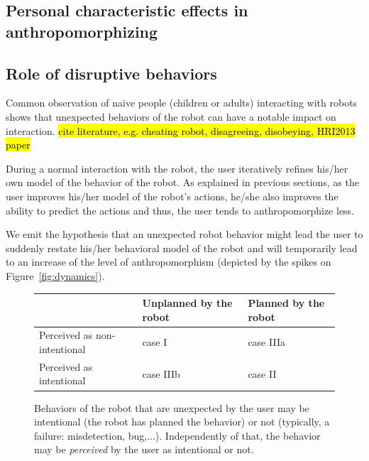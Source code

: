 \documentclass[lettersize, apacite, twoside, HRI]{apa_HRI}
\begin{document}
\subsection{Personal characteristic effects in anthropomorphizing}
\label{sec:8.3}

\subsection{Role of disruptive behaviors}
\label{sec:disruptive}

Common observation of naive people (children or adults) interacting with robots
shows that unexpected behaviors of the robot can have a notable impact on
interaction. \hl{cite literature, e.g. cheating robot, disagreeing, disobeying, HRI2013 paper}

During a normal interaction with the robot, the user iteratively refines his/her own
model of the behavior of the robot. As explained in previous sections, as the
user improves his/her model of the robot's actions, he/she also improves the ability to predict
the actions and thus, the user tends to anthropomorphize less.

We emit the hypothesis that an unexpected robot behavior might lead the user to
suddenly restate his/her behavioral model of the robot and will temporarily lead to
an increase of the level of anthropomorphism (depicted by the spikes on
Figure~\ref{fig:dynamics}).

\begin{figure}
\begin{center}
    \begin{tabular}{ | >{\centering\arraybackslash}m{1.5cm} | >{\centering\arraybackslash}m{2cm} | >{\centering\arraybackslash}m{2cm} |}
    \hline
     & Unplanned by the robot & Planned by the robot \\ \hline
    Perceived as non-intentional & case I  & case IIIa  \\ \hline
    Perceived as intentional &  case IIIb & case II \\
    \hline
    \end{tabular}
\end{center}
\caption{
    Behaviors of the robot that are unexpected by the user may be intentional
    (the robot has planned the behavior) or not (typically, a failure:
    misdetection, bug,...). Independently of that, the behavior may be
    \emph{perceived} by the user as intentional or not.}
\label{fig:perceptionUnexpectedBehavior}
\end{figure}
\end{document}
